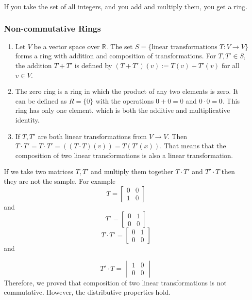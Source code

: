 \documentclass[11pt, draft]{article}
\begin{document}
\begin{fact}
    If you take the set of all integers, and you add and multiply them, you get a ring.
\end{fact}

\subsubsection{Non-commutative Rings}
\begin{enumerate}
    \item Let \(V\) be a vector space over \(\mathbb{R}\). The set \(S = \{\text{linear
              transformations } T: V \to V\}\) forms a ring with addition and composition of
          transformations. For \(T, T' \in S\), the addition \(T + T'\) is defined by
          \((T + T')(v) := T(v) + T'(v)\) for all \(v \in V\).
    \item The zero ring is a ring in which the product of any two elements is zero. It
          can be defined as \( R = \{0\} \) with the operations \( 0 + 0 = 0 \) and \( 0
          \cdot 0 = 0 \). This ring has only one element, which is both the additive and
          multiplicative identity.
    \item If \(T, T'\) are both linear transformations from \(V \rightarrow V\). Then \(T \cdot T' = T \cdot T' = \left((T \cdot T)(v)  \right) = T(T'(x))\). That means that the composition of two linear transformations is also a linear transformation. 
\end{enumerate}
\begin{fact}
    If we take two matrices \(T, T'\) and multiply them together \(T \cdot T'\) and \(T' \cdot T\) then they are not the sample. For example
    \[T = \begin{bmatrix}
        0 & 0 \\    
1 & 0
    \end{bmatrix}\] and 
    \[T'=\begin{bmatrix}
        0 & 1 \\
        0 & 0
    \end{bmatrix}\]
    \[T \cdot T' = \begin{bmatrix}
        0 & 1 \\
        0 & 0
    \end{bmatrix}\] and

    \[T' \cdot T = \begin{vmatrix}
    1 & 0 \\
    0 & 0
    \end{vmatrix}\]
    Therefore, we proved that composition of two linear transformations is not commutative.
However, the distributive properties hold.
\end{fact}
\end{document}
